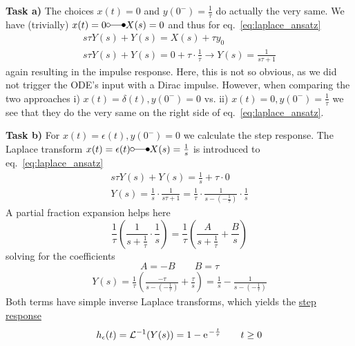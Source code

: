 \documentclass[11pt,a4paper,DIV=12]{scrartcl}
\begin{document}
\textbf{Task a)} The choices $x(t)=0$ and $y(0^-)=\frac{1}{\tau}$
do actually the very same.
We have (trivially) $x(t)=0 \laplace X(s)=0$ and thus for eq.~\eqref{eq:laplace_ansatz}
\begin{align}
s \tau  Y(s) + Y(s) = X(s) + \tau y_0\\
s \tau  Y(s) + Y(s) = 0 + \tau \cdot \frac{1}{\tau}
\longrightarrow Y(s) = \frac{1}{s \tau + 1}
\end{align}
again resulting in the impulse response. Here, this is not so obvious, as
we did not trigger the ODE's input with a Dirac impulse.
However, when comparing the
two approaches i) $x(t)=\delta(t), y(0^-)=0$ vs. ii) $x(t)=0, y(0^-)=\frac{1}{\tau}$
we see that they do the very same on the right side of eq.~\eqref{eq:laplace_ansatz}.

\textbf{Task b)} For $x(t)=\epsilon(t), y(0^-)=0$ we calculate the step response.
The Laplace transform $x(t)=\epsilon(t) \laplace X(s) = \frac{1}{s}$ is introduced to eq.~\eqref{eq:laplace_ansatz}
\begin{align}
s \tau Y(s) + Y(s) = \frac{1}{s} + \tau \cdot 0\\
Y(s) = \frac{1}{s} \cdot \frac{1}{s \tau + 1} = \frac{1}{\tau} \cdot \frac{1}{s - (-\frac{1}{\tau})} \cdot \frac{1}{s}
\end{align}
A partial fraction expansion helps here
\begin{equation}
\frac{1}{\tau} (\frac{1}{s + \frac{1}{\tau}} \cdot \frac{1}{s} ) =
\frac{1}{\tau} (\frac{A}{s + \frac{1}{\tau}} + \frac{B}{s})
\end{equation}
solving for the coefficients
\begin{equation}
  A=-B\qquad B = \tau
\end{equation}
\begin{align}
Y(s) = \frac{1}{\tau} (\frac{-\tau}{s - (-\frac{1}{\tau})} + \frac{\tau}{s})
= \frac{1}{s} - \frac{1}{s - (-\frac{1}{\tau})}
\end{align}
Both terms have simple inverse Laplace transforms, which yields the \underline{step response}
\begin{align}
h_\epsilon(t) = \mathcal{L}^{-1}(Y(s)) = 1 - \e^{-\frac{t}{\tau}}\qquad t \geq 0
\end{align}
\end{document}
